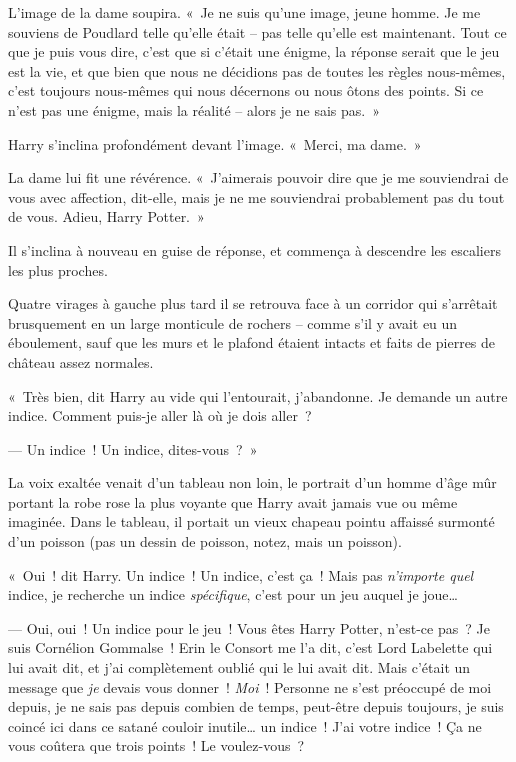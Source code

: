 L'image de la dame soupira.
«~Je ne suis qu'une image, jeune homme.
Je me souviens de Poudlard telle qu'elle était -- pas telle qu'elle est maintenant.
Tout ce que je puis vous dire, c'est que si c'était une énigme, la réponse serait que le jeu est la vie, et que bien que nous ne décidions pas de toutes les règles nous-mêmes, c'est toujours nous-mêmes qui nous décernons ou nous ôtons des points.
Si ce n'est pas une énigme, mais la réalité -- alors je ne sais pas.~»

Harry s'inclina profondément devant l'image. «~Merci, ma dame.~»

La dame lui fit une révérence. «~J'aimerais pouvoir dire que je me souviendrai de vous avec affection, dit-elle, mais je ne me souviendrai probablement pas du tout de vous. Adieu, Harry Potter.~»

Il s'inclina à nouveau en guise de réponse, et commença à descendre les escaliers les plus proches.

Quatre virages à gauche plus tard il se retrouva face à un corridor qui s'arrêtait brusquement en un large monticule de rochers -- comme s'il y avait eu un éboulement, sauf que les murs et le plafond étaient intacts et faits de pierres de château assez normales.

«~Très bien, dit Harry au vide qui l'entourait, j'abandonne.
Je demande un autre indice.
Comment puis-je aller là où je dois aller~?

--- Un indice~! Un indice, dites-vous~?~»

La voix exaltée venait d'un tableau non loin, le portrait d'un homme d'âge mûr portant la robe rose la plus voyante que Harry avait jamais vue ou même imaginée.
Dans le tableau, il portait un vieux chapeau pointu affaissé surmonté d'un poisson (pas un dessin de poisson, notez, mais un poisson).

«~Oui~! dit Harry. Un indice~! Un indice, c'est ça~! Mais pas \emph{n'importe quel} indice, je recherche un indice \emph{spécifique}, c'est pour un jeu auquel je joue…

--- Oui, oui~! Un indice pour le jeu~! Vous êtes Harry Potter, n'est-ce pas~? Je suis Cornélion Gommalse~!
Erin le Consort me l'a dit, c’est Lord Labelette qui lui avait dit, et j’ai complètement oublié qui le lui avait dit.
Mais c'était un message que \emph{je} devais vous donner~!
\emph{Moi}~! Personne ne s'est préoccupé de moi depuis, je ne sais pas depuis combien de temps, peut-être depuis toujours, je suis coincé ici dans ce satané couloir inutile… un indice~! J'ai votre indice~!
Ça ne vous coûtera que trois points~! Le voulez-vous~?

